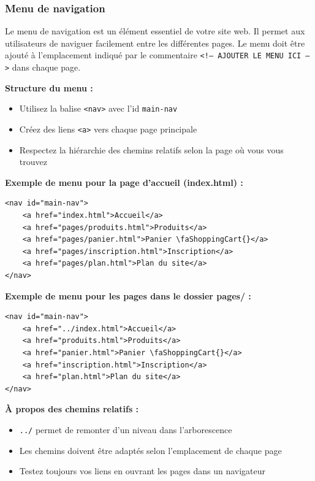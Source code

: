 \documentclass[12pt,a4paper]{article}
\begin{document}
\subsubsection{Menu de navigation}

Le menu de navigation est un élément essentiel de votre site web. Il permet aux utilisateurs de naviguer facilement entre les différentes pages. Le menu doit être ajouté à l'emplacement indiqué par le commentaire \texttt{<!-- AJOUTER LE MENU ICI -->} dans chaque page.

\textbf{Structure du menu :}
\begin{itemize}
\item Utilisez la balise \texttt{<nav>} avec l'id \texttt{main-nav}
\item Créez des liens \texttt{<a>} vers chaque page principale
\item Respectez la hiérarchie des chemins relatifs selon la page où vous vous trouvez
\end{itemize}

\textbf{Exemple de menu pour la page d'accueil (index.html) :}

\begin{lstlisting}
<nav id="main-nav">
    <a href="index.html">Accueil</a>
    <a href="pages/produits.html">Produits</a>
    <a href="pages/panier.html">Panier \faShoppingCart{}</a>
    <a href="pages/inscription.html">Inscription</a>
    <a href="pages/plan.html">Plan du site</a>
</nav>
\end{lstlisting}

\textbf{Exemple de menu pour les pages dans le dossier pages/ :}

\begin{lstlisting}
<nav id="main-nav">
    <a href="../index.html">Accueil</a>
    <a href="produits.html">Produits</a>
    <a href="panier.html">Panier \faShoppingCart{}</a>
    <a href="inscription.html">Inscription</a>
    <a href="plan.html">Plan du site</a>
</nav>
\end{lstlisting}

\textbf{À propos des chemins relatifs :}
\begin{itemize}
\item \texttt{../} permet de remonter d'un niveau dans l'arborescence
\item Les chemins doivent être adaptés selon l'emplacement de chaque page
\item Testez toujours vos liens en ouvrant les pages dans un navigateur
\end{itemize}
\end{document}
